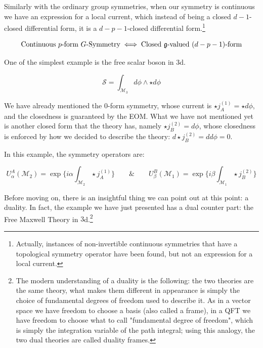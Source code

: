 \documentclass[aps,preprint,nofootinbib,preprintnumbers,eqsecnum,superscriptaddress]{revtex4}
\numberwithin{equation}{section}
\begin{document}
Similarly with the ordinary group symmetries, when our symmetry is continuous we have an expression for a local current, which instead of being a closed $d-1$-closed differential form, it is a $d-p-1$-closed differential form.\footnote{Actually, instances of non-invertible continuous symmetries that have a topological symmetry operator have been found, but not an expression for a local current.}

\begin{equation}
    \text{Continuous $p$-form $G$-Symmetry} \iff \text{Closed } \frak{g}\text{-valued } (d-p-1)\text{-form}
\end{equation}

\begin{tcolorbox}[colback=green!5!white, colframe=green!75!black, title={Example: $1$-form symmetry from Superfluid}]
One of the simplest example is the free scalar boson in $3$d. 

\begin{equation}\label{eq:superfluid}
    \mathcal{S} = \int_{\mathcal{M}_3} d \phi \wedge \star d \phi
\end{equation}

We have already mentioned the $0$-form symmetry, whose current is $\star j^{(1)}_A = \star d \phi$, and the closedness is guaranteed by the EOM. What we have not mentioned yet is another closed form that the theory has, namely $\star j^{(2)}_B = d \phi$, whose closedness is enforced by how we decided to describe the theory: $d\star j^{(2)}_B = dd\phi = 0 $.

In this example, the symmetry operators are: 

\begin{equation}\label{eq:1form_sym-op}
    U^A_\alpha (\mathcal{M}_{2}) = \exp \{ i \alpha \int_{\mathcal{M}_{2}} \star j^{(1)}_A \} \qquad \& \qquad U^B_\beta (\mathcal{M}_{1}) = \exp \{ i \beta \int_{\mathcal{M}_{1}} \star j^{(2)}_B \}
\end{equation}

\end{tcolorbox} 

Before moving on, there is an insightful thing we can point out at this point: a duality. In fact, the example we have just presented has a dual counter part: the Free Maxwell Theory in $3$d.\footnote{The modern understanding of a duality is the following: the two theories are the same theory, what makes them different in appearance is simply the choice of fundamental degrees of freedom used to describe it. As in a vector space we have freedom to choose a basis (also called a frame), in a QFT we have freedom to choose what to call "fundamental degree of freedom", which is simply the integration variable of the path integral; using this analogy, the two dual theories are called duality frames.}
\end{document}
